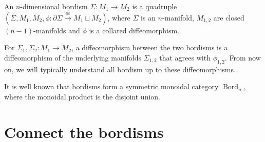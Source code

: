 \documentclass[a4paper]{article}
\begin{document}
\begin{definition}
	An $n$-dimensional bordism $\Sigma\colon M_1 \to M_2$ is a quadruple $(\Sigma, M_1, M_2, \phi\colon \partial \Sigma \xrightarrow{\cong} M_1 \sqcup \overline{M_2})$,
	where $\Sigma$ is an $n$-manifold, $M_{1,2}$ are closed $(n-1)$-manifolds and $\phi$ is a collared diffeomorphism.
	
	For $\Sigma_1, \Sigma_2\colon M_1 \to M_2$,
	a diffeomorphism between the two bordisms is a diffeomorphism of the underlying manifolds $\Sigma_{1,2}$ that agrees with $\phi_{1,2}$.
	From now on, we will typically understand all bordism up to these diffeomorphisms.
\end{definition}
It is well known that bordisms form a symmetric monoidal category $\operatorname{Bord}_n$,
where the monoidal product is the disjoint union.

\section{Connect the bordisms}
\label{sec:connect bordisms}
\end{document}
